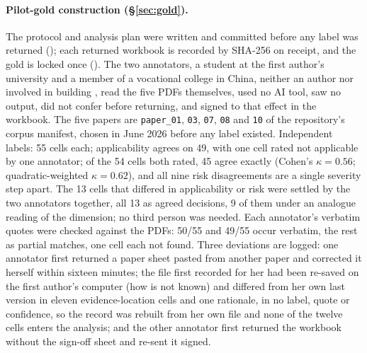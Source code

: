 \paragraph{Pilot-gold construction (\S\ref{sec:gold}).}
The protocol and analysis plan were written and committed before any label was
returned (); each returned workbook
is recorded by SHA-256 on receipt, and the gold is locked once
(). The two annotators, a student at
the first author's university and a member of a vocational college in China,
neither an author nor involved in building \sys{}, read the five PDFs
themselves, used no AI tool, saw no \sys{} output, did not confer before
returning, and signed to that effect in the workbook. The five papers are \texttt{paper\_01}, \texttt{03}, \texttt{07}, \texttt{08} and
\texttt{10} of the repository's corpus manifest, chosen in June 2026 before any
label existed. Independent labels: 55
cells each; applicability agrees on 49, with one cell rated not applicable by
one annotator; of the 54 cells both rated, 45 agree exactly (Cohen's
$\kappa=0.56$; quadratic-weighted $\kappa=0.62$), and all nine risk
disagreements are a single severity step apart. The 13 cells that differed in
applicability or risk were settled by the two annotators together, all 13 as
agreed decisions, 9 of them under an analogue reading of the dimension; no
third person was needed. Each annotator's verbatim quotes were checked against
the PDFs: 50/55 and 49/55 occur verbatim, the rest as partial matches, one cell
each not found. Three deviations are logged: one annotator first returned a
paper sheet pasted from another paper and corrected it herself within sixteen
minutes; the file first recorded for her had been re-saved on the first
author's computer (how is not known) and differed from her own last version in
eleven evidence-location cells and one rationale, in no label, quote or
confidence, so the record was rebuilt from her own file and none of the twelve
cells enters the analysis; and the other annotator first returned the workbook
without the sign-off sheet and re-sent it signed.

